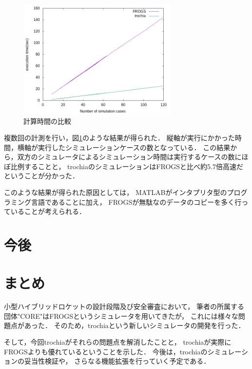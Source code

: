 \documentclass[a4j,10pt]{jsarticle}
\begin{document}
\begin{figure}[htbp]
	\begin{center}
		\includegraphics[width=8cm]{./sim-time.png}
		\caption{計算時間の比較}
		\label{sim-time}
	\end{center}
\end{figure}

複数回の計測を行い，図\ref{sim-time}のような結果が得られた．
縦軸が実行にかかった時間，横軸が実行したシミュレーションケースの数となっている．
この結果から，双方のシミュレータによるシミュレーション時間は実行するケースの数にほぼ比例することと，
trochiaのシミュレーションはFROGSと比べ約5.7倍高速だということが分かった．

このような結果が得られた原因としては，
MATLABがインタプリタ型のプログラミング言語であることに加え，
FROGSが無駄なのデータのコピーを多く行っていることが考えられる．

\section{今後}

\section{まとめ}

小型ハイブリッドロケットの設計段階及び安全審査において，
筆者の所属する団体"CORE"はFROGSというシミュレータを用いてきたが，
これには様々な問題点があった．
そのため，trochiaという新しいシミュレータの開発を行った．

そして，今回trochiaがそれらの問題点を解消したことと，
trochiaが実際にFROGSよりも優れているということを示した．
今後は，trochiaのシミュレーションの妥当性検証や，
さらなる機能拡張を行っていく予定である．
\end{document}
